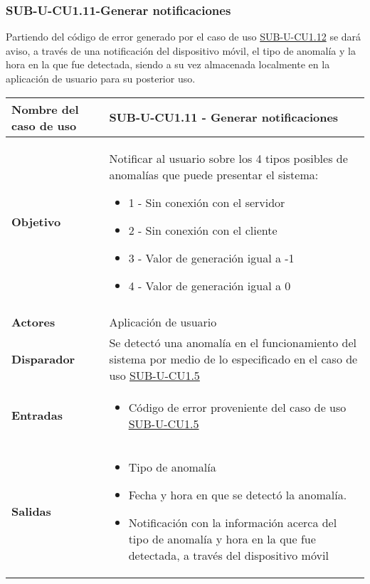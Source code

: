\subsubsection{SUB-U-CU1.11-Generar notificaciones}\label{SUB-U-CU1.11}
Partiendo del código de error generado por el caso de uso \hyperref[SUB-U-CU1.5]{SUB-U-CU1.12} se dará aviso, a través de una notificación del dispositivo móvil, el tipo de anomalía y la hora en la que fue detectada, siendo a su vez almacenada localmente en la aplicación de usuario para su posterior uso.  


\begin{longtable}{|J{5cm}|J{10.3cm}|}
	\hline
	\textbf{Nombre del caso de uso} &
		SUB-U-CU1.11 - Generar notificaciones
 \\ \hline
	\textbf{Objetivo} &
		Notificar al usuario sobre los 4 tipos posibles de anomalías que puede presentar el sistema:
		\begin{itemize}
			\item 1 - Sin conexión con el servidor
			\item 2 - Sin conexión con el cliente
			\item 3 - Valor de generación igual a -1
			\item 4 - Valor de generación igual a 0
		\end{itemize} \\ \hline
 \\ \hline
	\textbf{Actores} &
		Aplicación de usuario \\ \hline 
	\textbf{Disparador} & 
		Se detectó una anomalía en el funcionamiento del sistema por medio de lo especificado en el caso de uso \hyperref[SUB-U-CU1.5]{SUB-U-CU1.5}  \\ \hline 
	\textbf{Entradas} & 
		\begin{itemize}
				\item Código de error proveniente del caso de uso \hyperref[SUB-U-CU1.5]{SUB-U-CU1.5}
		\end{itemize}\\ \hline 
	\textbf{Salidas} & 
		\begin{itemize}
		    \item Tipo de anomalía
			\item Fecha y hora en que se detectó la anomalía.
			\item Notificación con la información acerca del tipo de anomalía y hora en la que fue detectada, a través del dispositivo móvil
		\end{itemize} \\ \hline

\end{longtable}
